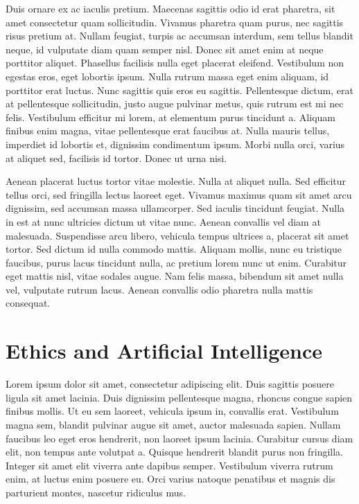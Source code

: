 \documentclass[
  letterpaper,
  DIV=11,
  numbers=noendperiod]{scrreprt}
\begin{document}
Duis ornare ex ac iaculis pretium. Maecenas sagittis odio id erat
pharetra, sit amet consectetur quam sollicitudin. Vivamus pharetra quam
purus, nec sagittis risus pretium at. Nullam feugiat, turpis ac accumsan
interdum, sem tellus blandit neque, id vulputate diam quam semper nisl.
Donec sit amet enim at neque porttitor aliquet. Phasellus facilisis
nulla eget placerat eleifend. Vestibulum non egestas eros, eget lobortis
ipsum. Nulla rutrum massa eget enim aliquam, id porttitor erat luctus.
Nunc sagittis quis eros eu sagittis. Pellentesque dictum, erat at
pellentesque sollicitudin, justo augue pulvinar metus, quis rutrum est
mi nec felis. Vestibulum efficitur mi lorem, at elementum purus
tincidunt a. Aliquam finibus enim magna, vitae pellentesque erat
faucibus at. Nulla mauris tellus, imperdiet id lobortis et, dignissim
condimentum ipsum. Morbi nulla orci, varius at aliquet sed, facilisis id
tortor. Donec ut urna nisi.

Aenean placerat luctus tortor vitae molestie. Nulla at aliquet nulla.
Sed efficitur tellus orci, sed fringilla lectus laoreet eget. Vivamus
maximus quam sit amet arcu dignissim, sed accumsan massa ullamcorper.
Sed iaculis tincidunt feugiat. Nulla in est at nunc ultricies dictum ut
vitae nunc. Aenean convallis vel diam at malesuada. Suspendisse arcu
libero, vehicula tempus ultrices a, placerat sit amet tortor. Sed dictum
id nulla commodo mattis. Aliquam mollis, nunc eu tristique faucibus,
purus lacus tincidunt nulla, ac pretium lorem nunc ut enim. Curabitur
eget mattis nisl, vitae sodales augue. Nam felis massa, bibendum sit
amet nulla vel, vulputate rutrum lacus. Aenean convallis odio pharetra
nulla mattis consequat.

\chapter{Ethics and Artificial
Intelligence}\label{ethics-and-artificial-intelligence}

Lorem ipsum dolor sit amet, consectetur adipiscing elit. Duis sagittis
posuere ligula sit amet lacinia. Duis dignissim pellentesque magna,
rhoncus congue sapien finibus mollis. Ut eu sem laoreet, vehicula ipsum
in, convallis erat. Vestibulum magna sem, blandit pulvinar augue sit
amet, auctor malesuada sapien. Nullam faucibus leo eget eros hendrerit,
non laoreet ipsum lacinia. Curabitur cursus diam elit, non tempus ante
volutpat a. Quisque hendrerit blandit purus non fringilla. Integer sit
amet elit viverra ante dapibus semper. Vestibulum viverra rutrum enim,
at luctus enim posuere eu. Orci varius natoque penatibus et magnis dis
parturient montes, nascetur ridiculus mus.
\end{document}
